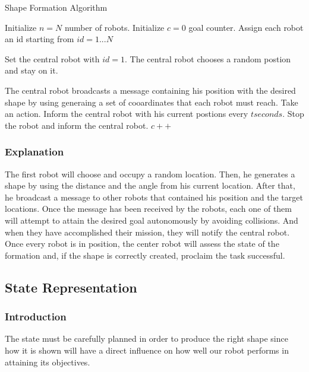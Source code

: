 \documentclass[12pt]{extarticle}
\begin{document}
\begin{algorithm}[H]
\caption{Shape Formation Algorithm}
\label{alg:ddpg}
\begin{algorithmic}[1]

\State Initialize $n=N$ number of robots.
\State Initialize $c=0$ goal counter.
\State Assign each robot an id starting from $id=1...N$

\State Set the central robot with $id=1$.
\State The central robot  chooses a random postion and stay on it.

\State The central robot broadcasts a message containing his position with the desired shape by using generaing a set of cooardinates that each robot must reach.
\State Take an action.
\State Inform the central robot with his current postions every $t seconds$.
    \State Stop the robot and inform the central robot.
    \State $c++$ 

\EndIf 

\EndFor

\EndWhile

\end{algorithmic}
\end{algorithm}

\subsubsection{Explanation}



The first robot will choose and occupy a random location. Then, he generates a shape by using the distance and the angle from his current location. After that, he broadcast a message to other robots that contained his position and the target locations. Once the message has been received by the robots, each one of them will attempt to attain the desired goal autonomously by avoiding collisions. And when they have accomplished their mission, they will notify the central robot. Once every robot is in position, the center robot will assess the state of the formation and, if the shape is correctly created, proclaim the task successful.




\subsection{State Representation}

\subsubsection{Introduction}
The state must be carefully planned in order to produce the right shape since how it is shown will have a direct influence on how well our robot performs in attaining its objectives.
\end{document}
